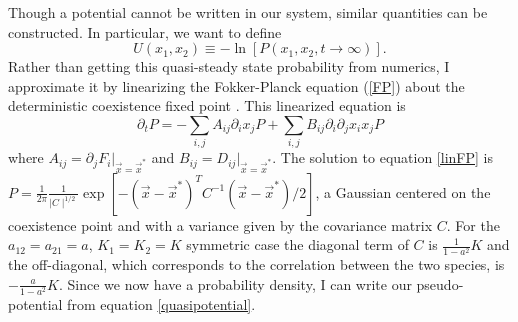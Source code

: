 Though a potential cannot be written in our system, similar quantities can be constructed. 
In particular, we want to define
\begin{equation}
U(x_1,x_2) \equiv -\ln\left[P(x_1,x_2,t\rightarrow\infty)\right].
\label{quasipotential}
\end{equation}
Rather than getting this quasi-steady state probability from numerics, I approximate it by linearizing the Fokker-Planck equation (\ref{FP}) about the deterministic coexistence fixed point \cite{VanKampen1992}. 
This linearized equation is
\begin{equation}
\partial_t P = -\sum_{i,j} A_{ij}\partial_i x_j P + \sum_{i,j} B_{ij} \partial_i\partial_j x_i x_j P
\label{linFP}
\end{equation}
where $A_{ij}=\partial_j F_i \lvert_{\vec{x}=\vec{x}^*}$ and $B_{ij}=D_{ij} \lvert_{\vec{x}=\vec{x}^*}$. 
The solution to equation \ref{linFP} is $P=\frac{1}{2\pi}\frac{1}{\mid C\mid^{1/2}}\exp[-(\vec{x} - \vec{x}^*)^T C^{-1}(\vec{x} - \vec{x}^*)/2]$, a Gaussian centered on the coexistence point and with a variance given by the covariance matrix $C$. 
For the $a_{12}=a_{21}=a$, $K_1=K_2=K$ symmetric case the diagonal term of $C$ is $\frac{1}{1-a^2}K$ and the off-diagonal, which corresponds to the correlation between the two species, is $-\frac{a}{1-a^2}K$. 
Since we now have a probability density, I can write our pseudo-potential from equation \ref{quasipotential}. 

